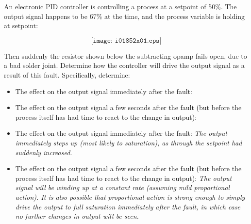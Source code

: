 

An electronic PID controller is controlling a process at a setpoint of 50\%.  The output signal happens to be 67\% at the time, and the process variable is holding at setpoint:

$$\texttt{[image: i01852x01.eps]}$$

Then suddenly the resistor shown below the subtracting opamp fails open, due to a bad solder joint.  Determine how the controller will drive the output signal as a result of this fault.  Specifically, determine:

\begin{itemize}
\item{} The effect on the output signal immediately after the fault:
\vskip 10pt
\item{} The effect on the output signal a few seconds after the fault (but before the process itself has had time to react to the change in output):
\end{itemize}







\begin{itemize}
\item{} The effect on the output signal immediately after the fault: {\it The output immediately steps up (most likely to saturation), as through the setpoint had suddenly increased.}
\vskip 10pt
\item{} The effect on the output signal a few seconds after the fault (but before the process itself has had time to react to the change in output): {\it The output signal will be winding up at a constant rate (assuming mild proportional action).  It is also possible that proportional action is strong enough to simply drive the output to full saturation immediately after the fault, in which case no further changes in output will be seen.}
\end{itemize}











